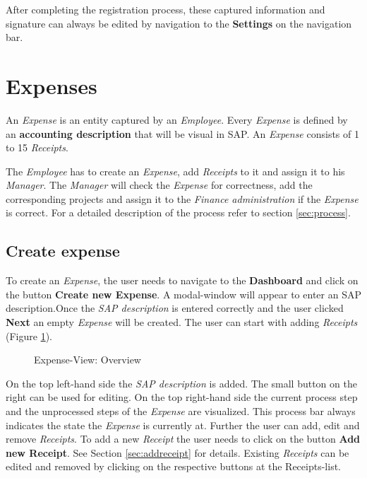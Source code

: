 After completing the registration process, these captured information and signature can always be edited by navigation to the \textbf{Settings} on the navigation bar.
\clearpage

\section{Expenses}

An \textit{Expense} is an entity captured by an \textit{Employee}. Every \textit{Expense} is defined by an \textbf{accounting description} that will be visual in SAP. An \textit{Expense} consists of 1 to 15 \textit{Receipts}.

The \textit{Employee} has to create an \textit{Expense}, add \textit{Receipts} to it and assign it to his \textit{Manager}. The \textit{Manager} will check the \textit{Expense} for correctness, add the corresponding projects and assign it to the \textit{Finance administration} if the \textit{Expense} is correct. For a detailed description of the process refer to section \ref{sec:process}.

\subsection{Create expense}

To create an \textit{Expense}, the user needs to navigate to the \textbf{Dashboard} and click on the button \textbf{Create new Expense}. A modal-window will appear to enter an SAP description.\newline Once the \textit{SAP description} is entered correctly and the user clicked \textbf{Next} an empty \textit{Expense} will be created. The user can start with adding \textit{Receipts} (Figure \ref{fig:expensesitems-overview}).

\begin{figure}[H]
    \centering
    \caption{Expense-View: Overview}
    \label{fig:expensesitems-overview}
\end{figure}

On the top left-hand side the \textit{SAP description} is added. The small button on the right can be used for editing. On the top right-hand side the current process step and the unprocessed steps of the \textit{Expense} are visualized. This process bar always indicates the state the \textit{Expense} is currently at.\newline
Further the user can add, edit and remove \textit{Receipts}. To add a new \textit{Receipt} the user needs to click on the button \textbf{Add new Receipt}. See Section \ref{sec:addreceipt} for details.\newline
Existing \textit{Receipts} can be edited and removed by clicking on the respective buttons at the Receipts-list.


